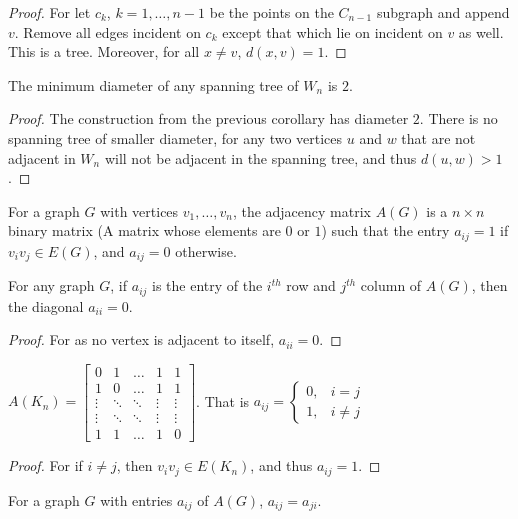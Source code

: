 \documentclass[crop=false,class=book,oneside]{standalone}
\begin{document}
\begin{proof}
For let $c_k$, $k=1,\hdots,n-1$ be the points on the $C_{n-1}$ subgraph and append $v$. Remove all edges incident on $c_k$ except that which lie on incident on $v$ as well. This is a tree. Moreover, for all $x\ne v$, $d(x,v) = 1$.
\end{proof}
\begin{corollary}
The minimum diameter of any spanning tree of $W_n$ is $2$.
\end{corollary}
\begin{proof}
The construction from the previous corollary has diameter $2$. There is no spanning tree of smaller diameter, for any two vertices $u$ and $w$ that are not adjacent in $W_n$ will not be adjacent in the spanning tree, and thus $d(u,w)>1$.
\end{proof}
\begin{definition}
For a graph $G$ with vertices $v_1,\hdots, v_n$, the adjacency matrix $A(G)$ is a $n\times n$ binary matrix (A matrix whose elements are $0$ or $1$) such that the entry $a_{ij}= 1$ if $v_i v_j \in E(G)$, and $a_{ij}=0$ otherwise.
\end{definition}
\begin{corollary}
For any graph $G$, if $a_{ij}$ is the entry of the $i^{th}$ row and $j^{th}$ column of $A(G)$, then the diagonal $a_{ii} = 0$.
\end{corollary}
\begin{proof}
For as no vertex is adjacent to itself, $a_{ii}=0$.
\end{proof}
\begin{corollary}
$A(K_n) = \begin{bmatrix} 0 & 1 &  \hdots & 1 & 1 \\ 1 & 0 & \hdots & 1 & 1 \\ \vdots & \ddots & \ddots & \vdots & \vdots \\ \vdots & \ddots & \ddots & \vdots & \vdots \\ 1 & 1 & \hdots & 1 & 0 \end{bmatrix}$. That is $a_{ij} = \begin{cases} 0, & i=j \\ 1, & i\ne j\end{cases}$
\end{corollary}
\begin{proof}
For if $i\ne j$, then $v_iv_j \in E(K_n)$, and thus $a_{ij}=1$.
\end{proof}
\begin{corollary}
For a graph $G$ with entries $a_{ij}$ of $A(G)$, $a_{ij} = a_{ji}$.
\end{corollary}
\end{document}
